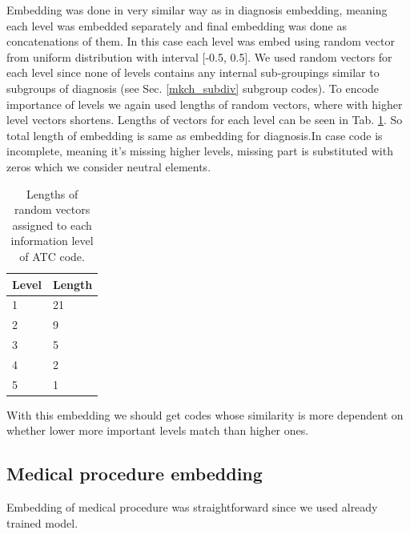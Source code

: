 Embedding was done in very similar way as in diagnosis embedding, meaning each level was embedded separately and final embedding was done as concatenations of them. In this case each level was embed using random vector from uniform distribution with interval [-0.5, 0.5]. We used random vectors for each level since none of levels contains any internal sub-groupings similar to subgroups of diagnosis (see Sec. \ref{mkch_subdiv} subgroup codes). To encode importance of levels we again used lengths of random vectors, where with higher level vectors shortens. Lengths of vectors for each level can be seen in Tab. \ref{tab:drug_lev_len}. So total length of embedding is same as embedding for diagnosis.In case code is incomplete, meaning it's missing higher levels, missing part is substituted with zeros which we consider neutral elements.
\\

\begin{table}[!h]
	\centering
	\begin{tabular}{|l|l|}
		\hline
		Level  & Length \\ \hline
		1 & 21 \\ \hline
		2 & 9 \\ \hline
		3 & 5 \\ \hline
		4 & 2 \\ \hline
		5 & 1 \\ \hline
	\end{tabular}
	\caption{Lengths of random vectors assigned to each information level of ATC code.}
	\label{tab:drug_lev_len}
\end{table}  

With this embedding we should get codes whose similarity is more dependent on whether lower more important levels match than higher ones.

\subsection{Medical procedure embedding}

Embedding of medical procedure was straightforward since we used already trained model. 
\\

